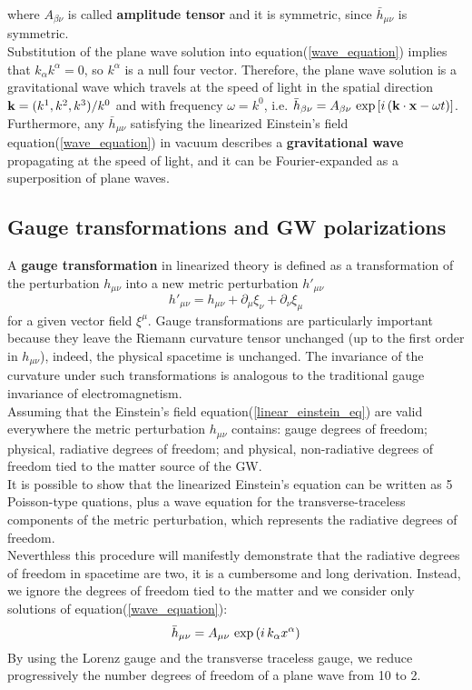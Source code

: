 where $A_{\beta \nu}$ is called \textbf{amplitude tensor} and it is symmetric, since $\bar{h}_{\mu \nu}$ is symmetric.\\
Substitution of the plane wave solution into equation(\ref{wave_equation}) implies that $k_{\alpha} k^{\alpha} =0$, so $k^{\alpha}$ is a null four vector. 
Therefore, the plane wave solution is a gravitational wave which travels at the speed of light in the spatial direction $\vb{k} = (k^{1},k^{2},k^{3})/k^{0}$ and with frequency $\omega=k^{0} $, i.e. $\bar{h}_{\beta \nu} = A_{\beta \nu} \, \exp\qty[i\, (\vb{k} \cdot \vb{x} - \omega t)]$.
Furthermore, any $\bar{h}_{\mu \nu}$ satisfying the linearized Einstein's field equation(\ref{wave_equation}) in vacuum describes a \textbf{gravitational wave} propagating at the speed of light, and it can be Fourier-expanded as a superposition of plane waves.
 

\subsection{Gauge transformations and GW polarizations}
A \textbf{gauge transformation} in linearized theory is defined as a transformation of the perturbation $h_{\mu \nu}$ into a new metric perturbation $h'_{\mu \nu}$
\begin{equation}
\label{gauge_transf}
h' _{\mu \nu} = h_{\mu \nu} + \partial_\mu \xi _{\nu} + \partial_\nu \xi _{\mu}
\end{equation}
for a given vector field $\xi^\mu$.
Gauge transformations are particularly important because they leave the Riemann curvature tensor unchanged (up to the first order in $h_{\mu \nu}$), indeed, the physical spacetime is unchanged. 
The invariance of the curvature under such transformations is analogous to the traditional gauge invariance of electromagnetism.\\
Assuming that the Einstein's field equation(\ref{linear_einstein_eq}) are valid everywhere the metric perturbation $h_{\mu \nu}$ contains: gauge degrees of freedom; physical, radiative degrees of freedom; and physical, non-radiative degrees of freedom tied to the matter source of the GW. \\
 It is possible to show that the linearized Einstein's equation can be written as 5 Poisson-type quations, plus a wave equation for the transverse-traceless components of the metric perturbation, which represents the radiative degrees of freedom.\\%
 Neverthless this procedure will manifestly demonstrate that the radiative degrees of freedom in spacetime are two, it is a cumbersome and long derivation.
Instead, we ignore the degrees of freedom tied to the matter and we consider only solutions of equation(\ref{wave_equation}):
\[
\bar{h}_{\mu \nu} = A_{\mu \nu} \, \exp\qty(i\, k_{\alpha} x^{\alpha})
\]
By using the Lorenz gauge and the transverse traceless gauge, we reduce progressively the number degrees of freedom of a plane wave from 10 to 2.\\


